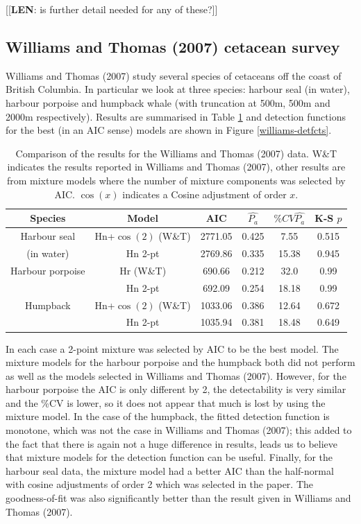 \documentclass[useAMS,referee]{biom}
\begin{document}
[[\textbf{LEN}: is further detail needed for any of these?]]

\subsection{Williams and Thomas (2007) cetacean survey}

Williams and Thomas (2007) study several species of cetaceans off the coast of British Columbia. In particular we look at three species: harbour seal (in water), harbour porpoise and humpback whale (with truncation at 500m, 500m and 2000m respectively). Results are summarised in Table \ref{williams-table} and detection functions for the best (in an AIC sense) models are shown in Figure \ref{williams-detfcts}.

\begin{table}
\caption{Comparison of the results for the Williams and Thomas (2007) data. W\&T indicates the results reported in Williams and Thomas (2007), other results are from mixture models where the number of mixture components was selected by AIC. $\cos(x)$ indicates a Cosine adjustment of order $x$.}
\centering
\begin{tabular}{c c c c c c}
\hline \hline
Species & Model & AIC & $\hat{P_a}$ & $\% CV \hat{P_a}$ & K-S $p$\\
\hline
Harbour seal & Hn+$\cos(2)$ (W\&T) & 2771.05 & 0.425 & 7.55 & 0.515\\
(in water) & Hn 2-pt  & 2769.86 & 0.335 & 15.38 & 0.945\\
Harbour porpoise & Hr (W\&T) & 690.66 & 0.212 & 32.0 & 0.99\\
 & Hn 2-pt & 692.09 & 0.254 & 18.18 & 0.99\\
Humpback & Hn+$\cos(2)$ (W\&T) & 1033.06 & 0.386 & 12.64 & 0.672 \\
 & Hn 2-pt & 1035.94 & 0.381 & 18.48 & 0.649 \\
\hline
\end{tabular}
\label{williams-table}
\end{table}

In each case a 2-point mixture was selected by AIC to be the best model. The mixture models for the harbour porpoise and the humpback both did not perform as well as the models selected in Williams and Thomas (2007). However, for the harbour porpoise the AIC is only different by 2, the detectability is very similar and the \%CV is lower, so it does not appear that much is lost by using the mixture model. In the case of the humpback, the fitted detection function is monotone, which was not the case in Williams and Thomas (2007); this added to the fact that there is again not a huge difference in results, leads us to believe that mixture models for the detection function can be useful. Finally, for the harbour seal data, the mixture model had a better AIC than the half-normal with cosine adjustments of order 2 which was selected in the paper. The goodness-of-fit was also significantly better than the result given in Williams and Thomas (2007).
\end{document}
